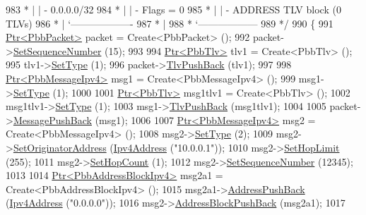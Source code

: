 \begin{DoxyCode}
983 \textcolor{comment}{         * |    |     - 0.0.0.0/32}
984 \textcolor{comment}{         * |    |     - Flags = 0}
985 \textcolor{comment}{         * |    | - ADDRESS TLV block (0 TLVs)}
986 \textcolor{comment}{         * |    `-------------------}
987 \textcolor{comment}{         * |}
988 \textcolor{comment}{         * `------------------}
989 \textcolor{comment}{   */}
990   \{
991     \hyperlink{classns3_1_1Ptr}{Ptr<PbbPacket>} packet = Create<PbbPacket> ();
992     packet->\hyperlink{classns3_1_1PbbPacket_a7d6a1602be86109760d0f26ff9bbbb8e}{SetSequenceNumber} (15);
993 
994     \hyperlink{classns3_1_1Ptr}{Ptr<PbbTlv>} tlv1 = Create<PbbTlv> ();
995     tlv1->\hyperlink{classns3_1_1PbbTlv_a90a0452018ed364ac37c3ad116dd718b}{SetType} (1);
996     packet->\hyperlink{classns3_1_1PbbPacket_a34935793e729a106c176db99c969cb42}{TlvPushBack} (tlv1);
997 
998     \hyperlink{classns3_1_1Ptr}{Ptr<PbbMessageIpv4>} msg1 = Create<PbbMessageIpv4> ();
999     msg1->\hyperlink{classns3_1_1PbbMessage_a4b3d1eaabd3e7412a46ac79bf3360dac}{SetType} (1);
1000 
1001     \hyperlink{classns3_1_1Ptr}{Ptr<PbbTlv>} msg1tlv1 = Create<PbbTlv> ();
1002     msg1tlv1->\hyperlink{classns3_1_1PbbTlv_a90a0452018ed364ac37c3ad116dd718b}{SetType} (1);
1003     msg1->\hyperlink{classns3_1_1PbbMessage_aac70b2672f79765cf5cc5b6666018165}{TlvPushBack} (msg1tlv1);
1004 
1005     packet->\hyperlink{classns3_1_1PbbPacket_a4a3170001ef758d9c9c4375b8f089826}{MessagePushBack} (msg1);
1006 
1007     \hyperlink{classns3_1_1Ptr}{Ptr<PbbMessageIpv4>} msg2 = Create<PbbMessageIpv4> ();
1008     msg2->\hyperlink{classns3_1_1PbbMessage_a4b3d1eaabd3e7412a46ac79bf3360dac}{SetType} (2);
1009     msg2->\hyperlink{classns3_1_1PbbMessage_a52ac135a2bec53db5e8f46b8b8a25e7c}{SetOriginatorAddress} (\hyperlink{classns3_1_1Ipv4Address}{Ipv4Address} (\textcolor{stringliteral}{"10.0.0.1"}));
1010     msg2->\hyperlink{classns3_1_1PbbMessage_a532a7e5e135f7491f8a84ab1dfadd28f}{SetHopLimit} (255);
1011     msg2->\hyperlink{classns3_1_1PbbMessage_a882ec7e2e9a9dff6297152c196d54ce4}{SetHopCount} (1);
1012     msg2->\hyperlink{classns3_1_1PbbMessage_a8c24696ac67507afa03c9750daccc47d}{SetSequenceNumber} (12345);
1013 
1014     \hyperlink{classns3_1_1Ptr}{Ptr<PbbAddressBlockIpv4>} msg2a1 = Create<PbbAddressBlockIpv4> ();
1015     msg2a1->\hyperlink{classns3_1_1PbbAddressBlock_a7be545a53d69bd426dbebcf752ed8371}{AddressPushBack} (\hyperlink{classns3_1_1Ipv4Address}{Ipv4Address} (\textcolor{stringliteral}{"0.0.0.0"}));
1016     msg2->\hyperlink{classns3_1_1PbbMessage_a5f623bad2fb1adde7da885e1c92d5311}{AddressBlockPushBack} (msg2a1);
1017 

\end{DoxyCode}
